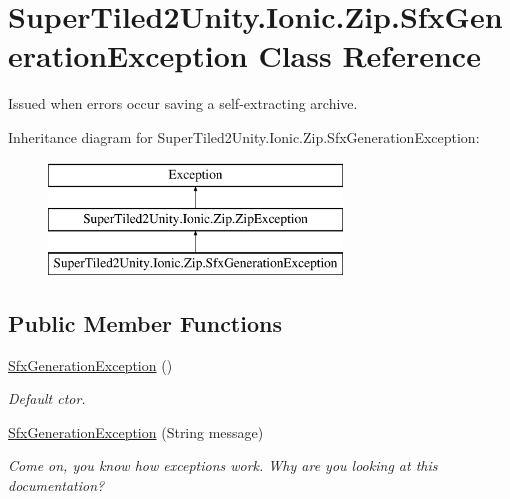 \hypertarget{class_super_tiled2_unity_1_1_ionic_1_1_zip_1_1_sfx_generation_exception}{}\section{Super\+Tiled2\+Unity.\+Ionic.\+Zip.\+Sfx\+Generation\+Exception Class Reference}
\label{class_super_tiled2_unity_1_1_ionic_1_1_zip_1_1_sfx_generation_exception}


Issued when errors occur saving a self-\/extracting archive.  


Inheritance diagram for Super\+Tiled2\+Unity.\+Ionic.\+Zip.\+Sfx\+Generation\+Exception\+:\begin{figure}[H]
\begin{center}
\leavevmode
\includegraphics[height=3.000000cm]{class_super_tiled2_unity_1_1_ionic_1_1_zip_1_1_sfx_generation_exception}
\end{center}
\end{figure}
\subsection*{Public Member Functions}
\begin{DoxyCompactItemize}
\item 
\mbox{\hyperlink{class_super_tiled2_unity_1_1_ionic_1_1_zip_1_1_sfx_generation_exception_a93ad14e02bc564184fe754e4af0b157d}{Sfx\+Generation\+Exception}} ()
\begin{DoxyCompactList}\small\item\em Default ctor. \end{DoxyCompactList}\item 
\mbox{\hyperlink{class_super_tiled2_unity_1_1_ionic_1_1_zip_1_1_sfx_generation_exception_aca5ac77b614f81f38692ebdbaf4de507}{Sfx\+Generation\+Exception}} (String message)
\begin{DoxyCompactList}\small\item\em Come on, you know how exceptions work. Why are you looking at this documentation? \end{DoxyCompactList}\end{DoxyCompactItemize}
